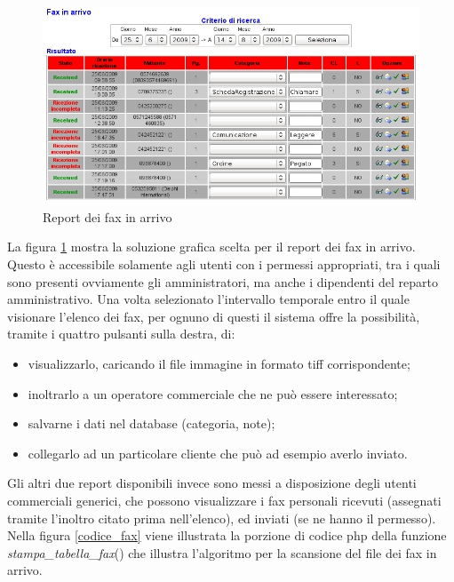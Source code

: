 \newpage
\begin{figure}[!ht]
\centering
  \includegraphics[scale=0.8]{./images/faxinarrivo.png}
\caption{Report dei fax in arrivo}
\label{fax_in_arrivo}
\end{figure}

\noindent
La figura \ref{fax_in_arrivo} mostra la soluzione grafica scelta per il report dei fax in arrivo. Questo \`e accessibile solamente agli utenti con i permessi appropriati, tra i quali sono presenti ovviamente gli amministratori, ma anche i dipendenti del reparto amministrativo. Una volta selezionato l'intervallo temporale entro il quale visionare l'elenco dei fax, per ognuno di questi il sistema offre la possibilit\`a, tramite i quattro pulsanti sulla destra, di:

\begin{itemize}
 \item visualizzarlo, caricando il file immagine in formato tiff corrispondente;
 \item inoltrarlo a un operatore commerciale che ne pu\`o essere interessato;
 \item salvarne i dati nel database (categoria, note);
 \item collegarlo ad un particolare cliente che pu\`o ad esempio averlo inviato.
\end{itemize}
\noindent
Gli altri due report disponibili invece sono messi a disposizione degli utenti commerciali generici, che possono visualizzare i fax personali ricevuti (assegnati tramite l'inoltro citato prima nell'elenco), ed inviati (se ne hanno il permesso).
\newpage
\noindent
Nella figura \ref{codice_fax} viene illustrata la porzione di codice php della funzione \textit{stampa\_{}tabella\_{}fax}() che illustra l'algoritmo per la scansione del file dei fax in arrivo.

